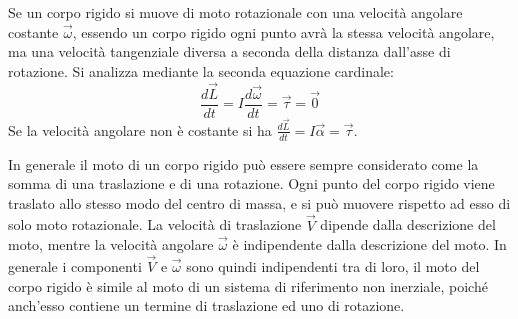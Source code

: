 \documentclass{article}
\numberwithin{equation}{subsection}
\begin{document}
Se un corpo rigido si muove di moto rotazionale con una velocità 
angolare costante $\vec{\omega}$, essendo un corpo rigido ogni punto avrà la stessa velocità angolare, ma una velocità tangenziale diversa a seconda della distanza 
dall'asse di rotazione. Si analizza mediante la seconda equazione cardinale:
\begin{equation}
    \displaystyle\frac{d\vec{L}}{dt}=I\frac{d\vec\omega}{dt}=\vec{\tau}=\vec0
\end{equation}
Se la velocità angolare non è costante si ha $\displaystyle\frac{d\vec{L}}{dt}=I\vec{\alpha}=\vec{\tau}$. 



In generale il moto di un corpo rigido può essere sempre considerato come la somma di una traslazione e di una rotazione. Ogni punto del corpo rigido viene traslato 
allo stesso modo del centro di massa, e si può muovere rispetto ad esso di solo moto rotazionale. La velocità di traslazione $\vec{V}$ dipende dalla descrizione del moto, 
mentre la velocità angolare $\vec{\omega}$ è indipendente dalla descrizione del moto. In generale i componenti $\vec{V}$ e $\vec{\omega}$ sono quindi indipendenti tra di loro, 
il moto del corpo rigido è simile al moto di un sistema di riferimento non inerziale, poiché anch'esso contiene un termine di traslazione ed uno di rotazione. 
\end{document}
